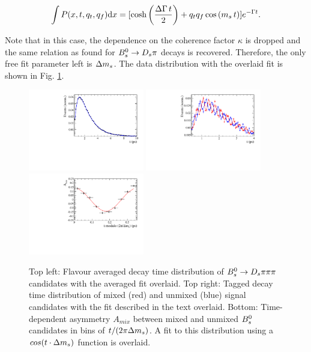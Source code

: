 \begin{equation}
\int P(x,t,q_t,q_f) \text d x = [\text{cosh} \left( \frac{\Delta \Gamma \, t}{2}\right) + q_t q_f \, \text{cos} \left( m_s \, t \right)] e^{- \Gamma t}.
\end{equation}

Note that in this case, the dependence on the coherence factor $\kappa$ is dropped and the same relation as found for ${{B}^0_{s}}\rightarrow{\ensuremath{{D}_{s}}}{\ensuremath{\pi}}$ decays is recovered. 
Therefore, the only free fit parameter left is ${\Delta m_{{s}}}$. The data distribution with the overlaid fit is shown in Fig. \ref{fig:tFitNorm}.

\begin{figure}[h]
	\centering
		\includegraphics[width=0.45\textwidth, height = !]{figs/timeFit/norm_taggingCalib/h_t.pdf} 
		\includegraphics[width=0.45\textwidth, height = !]{figs/timeFit/norm_taggingCalib/h_t_mixed.pdf} 
		\includegraphics[width=0.45\textwidth, height = !]{figs/timeFit/norm_taggingCalib/h_asym.pdf} 		
		\caption{Top left: Flavour averaged decay time distribution of ${{B}^0_{s}}\rightarrow{\ensuremath{{D}_{s}}}{\ensuremath{\pi}}{\ensuremath{\pi}}{\ensuremath{\pi}}$ candidates with the averaged fit overlaid. 
Top right: Tagged decay time distribution of mixed (red) and unmixed (blue) signal candidates with the fit described in the text overlaid. 
Bottom: Time-dependent asymmetry $A_{mix}$ between mixed and unmixed ${{B}^0_{s}}$ candidates in bins of $t/(2\pi{\ensuremath{\Delta m_{{s}}}})$. A fit to this distribution using a $cos(t\cdot{\ensuremath{\Delta m_{{s}}}})$ function is overlaid.} 		
		\label{fig:tFitNorm}
\end{figure}	

